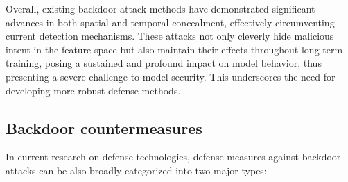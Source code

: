 \documentclass[lettersize,journal]{IEEEtran}
\begin{document}
Overall, existing backdoor attack methods have demonstrated significant advances in both spatial and temporal concealment, effectively circumventing current detection mechanisms. These attacks not only cleverly hide malicious intent in the feature space but also maintain their effects throughout long-term training, posing a sustained and profound impact on model behavior, thus presenting a severe challenge to model security. This underscores the need for developing more robust defense methods.

\subsection{Backdoor countermeasures}
In current research on defense technologies, defense measures against backdoor attacks can be also broadly categorized into two major types: %
\end{document}
